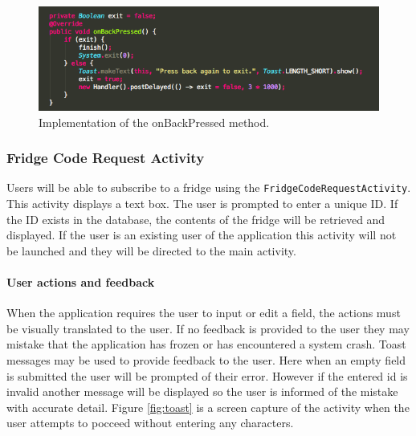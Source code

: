 \documentclass[a4paper, 11pt]{article}
\begin{document}
\vspace{\baselineskip}

\begin{figure}[h]
\centering
\includegraphics[width=\textwidth]{onBack}
\caption{Implementation of the onBackPressed method.} \label{fig:onBack}
\end{figure}


\subsubsection{Fridge Code Request Activity}
Users will be able to subscribe to a fridge using the \texttt{FridgeCodeRequestActivity}. This activity displays a text box. The user is prompted to enter a unique ID. If the ID exists in the database, the contents of the fridge will be retrieved and displayed. If the user is an existing user of the application this activity will not be launched and they will be directed to the main activity.

\paragraph{User actions and feedback}
When the application requires the user to input or edit a field, the actions must be visually translated to the user. If no feedback is provided to the user they may mistake that the application has frozen or has encountered a system crash. Toast messages may be used to provide feedback to the user. Here when an empty field is submitted the user will be prompted of their error. However if the entered id is invalid another message will be displayed so the user is informed of the mistake with accurate detail. Figure \ref{fig:toast} is a screen capture of the activity when the user attempts to pocceed without entering any characters. 

\vspace{\baselineskip}
\end{document}
